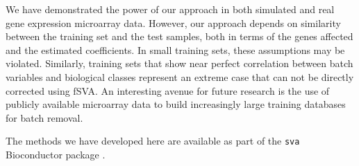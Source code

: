 \documentclass{bioinfo}
\begin{document}
We have demonstrated the power of our approach in both simulated and real gene expression microarray data. However, our approach depends on similarity between the training set and the test samples, both in terms of the genes affected and the estimated coefficients. In small training sets, these assumptions may be violated. Similarly, training sets that show near perfect correlation between batch variables and biological classes represent an extreme case that can not be directly corrected using fSVA. An interesting avenue for future research is the use of publicly available microarray data to build increasingly large training databases for batch removal. 

The methods we have developed here are available as part of the \texttt{sva} Bioconductor package \cite{Leek2012b}.





\end{document}
